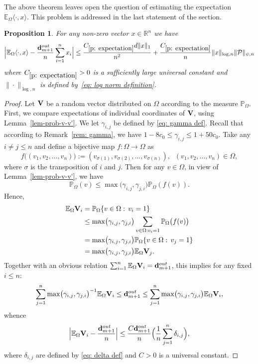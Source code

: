 \documentclass[12pt]{article}
\newtheorem{prop}[theorem]{Proposition}
\theoremstyle{definition}
\theoremstyle{plain}
\newcommand{\E}{\mathbb{E}}
\newcommand{\R}{\mathbb{R}}
\def\Prob{{\mathbb P}}
\def\OutDeg{{\bf d}^{out}}
\def\pvector{{\mathcal P}}
\begin{document}
\medskip

The above theorem leaves open the question of estimating the expectation $\E_\Omega\langle \cdot,x\rangle$.
This problem is addressed in the last statement of the section.

\begin{prop}\label{p: expectation}
For any non-zero vector $x\in\R^n$ we have
$$\Bigl|\E_{\Omega}\langle \cdot,x\rangle-\frac{\OutDeg_{m+1}}{n}\sum_{i=1}^n x_i\Bigr|\leq
\frac{C_{\ref{p: expectation}}d\|x\|_1}{n^2}+\frac{C_{\ref{p: expectation}}}{n}
\|x\|_{\log,n}\|\pvector\|_{\psi,n}$$
where $C_{\ref{p: expectation}}>0$ is a sufficiently large universal constant
and $\|\cdot\|_{\log,n}$ is defined by~\eqref{eq: log norm definition}.
\end{prop}
\begin{proof}
Let ${\bf{}V}$ be a random vector distributed on $\Omega$ according to the measure $\Prob_\Omega$.
First, we compare expectations of individual coordinates of ${\bf{}V}$, using Lemma~\ref{lem-prob-v-v'}.
We let $\gamma_{i,j}$ be defined by \eqref{eq: gamma def}.
Recall that according to Remark~\ref{rem: gamma}, we have $1-8c_0\leq \gamma_{i,j}\leq 1+50c_0$.
Take any $i\neq j\leq n$ and define a bijective map $f:\Omega\to\Omega$ as
$$f\bigl((v_1,v_2,\ldots,v_n)\bigr):=(v_{\sigma(1)},v_{\sigma(2)},\ldots,v_{\sigma(n)}),\;\;(v_1,v_2,\ldots,v_n)\in\Omega,$$
where $\sigma$ is the transposition of $i$ and $j$. Then
for any $v\in\Omega$, in view of Lemma~\ref{lem-prob-v-v'}, we have
$$\Prob_\Omega(v)
\leq \max\bigl(\gamma_{i,j},\gamma_{j,i}\bigr)\Prob_\Omega(f(v)).$$
Hence,
\begin{align*}
\E_\Omega {\bf{}V}_i&=\Prob_\Omega\{v\in\Omega:\,v_i=1\}\\
&\leq \max\bigl(\gamma_{i,j},\gamma_{j,i}\bigr)\sum_{v\in\Omega:v_i=1}\Prob_\Omega\bigl(f(v)\bigr)\\
&=\max\bigl(\gamma_{i,j},\gamma_{j,i}\bigr)\Prob_\Omega\{v\in\Omega:\,v_j=1\}\\
&=\max\bigl(\gamma_{i,j},\gamma_{j,i}\bigr)\E_\Omega {\bf{}V}_j.
\end{align*}
Together with an obvious relation $\sum_{i=1}^n\E_\Omega {\bf{}V}_i=\OutDeg_{m+1}$, this implies for any fixed $i\leq n$:
$$\sum_{j=1}^n\max\bigl(\gamma_{i,j},\gamma_{j,i}\bigr)^{-1}\E_\Omega {\bf{}V}_i\leq \OutDeg_{m+1}
\leq \sum_{j=1}^n\max\bigl(\gamma_{i,j},\gamma_{j,i}\bigr)\E_\Omega {\bf{}V}_i,$$
whence
$$\Bigl|\E_{\Omega}{\bf{}V}_i-\frac{\OutDeg_{m+1}}{n}\Bigr|\leq \frac{C\OutDeg_{m+1}}{n}\Bigl(\frac{1}{n}\sum_{j=1}^n\delta_{i,j}\Bigr),$$
where $\delta_{i,j}$ are defined by \eqref{eq: delta def} and $C>0$ is a universal constant.


\end{proof}
\end{document}
